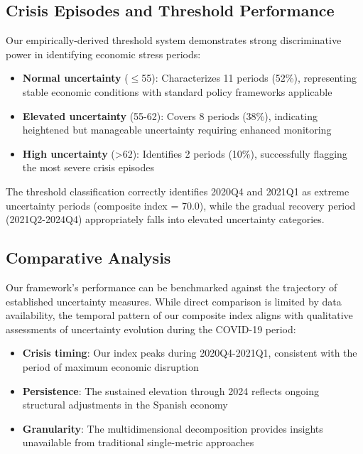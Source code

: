 \documentclass[5p,authoryear]{elsarticle}
\begin{document}
\subsection{Crisis Episodes and Threshold Performance}

Our empirically-derived threshold system demonstrates strong discriminative power in identifying economic stress periods:

\begin{itemize}
    \item \textbf{Normal uncertainty} ($\leq$55): Characterizes 11 periods (52\%), representing stable economic conditions with standard policy frameworks applicable
    \item \textbf{Elevated uncertainty} (55-62): Covers 8 periods (38\%), indicating heightened but manageable uncertainty requiring enhanced monitoring
    \item \textbf{High uncertainty} (>62): Identifies 2 periods (10\%), successfully flagging the most severe crisis episodes
\end{itemize}

The threshold classification correctly identifies 2020Q4 and 2021Q1 as extreme uncertainty periods (composite index = 70.0), while the gradual recovery period (2021Q2-2024Q4) appropriately falls into elevated uncertainty categories.

\subsection{Comparative Analysis}

Our framework's performance can be benchmarked against the trajectory of established uncertainty measures. While direct comparison is limited by data availability, the temporal pattern of our composite index aligns with qualitative assessments of uncertainty evolution during the COVID-19 period:

\begin{itemize}
    \item \textbf{Crisis timing}: Our index peaks during 2020Q4-2021Q1, consistent with the period of maximum economic disruption
    \item \textbf{Persistence}: The sustained elevation through 2024 reflects ongoing structural adjustments in the Spanish economy
    \item \textbf{Granularity}: The multidimensional decomposition provides insights unavailable from traditional single-metric approaches
\end{itemize}
\end{document}
